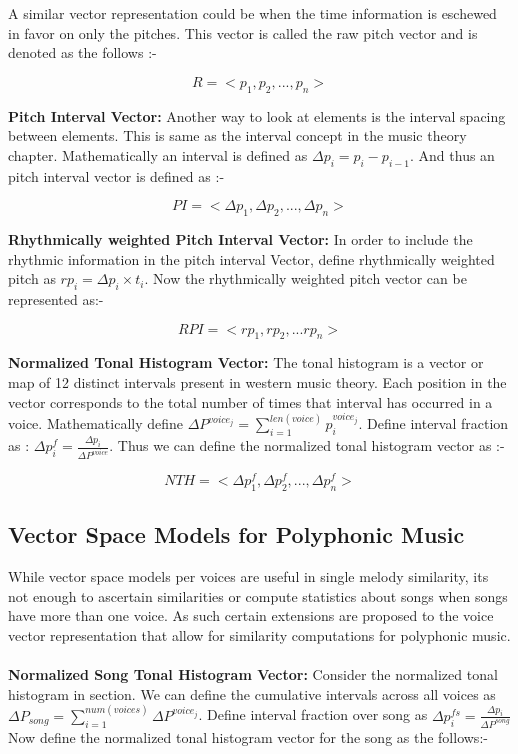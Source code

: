 \noindent A similar vector representation could be when the time information is eschewed in favor on only the pitches. This vector is called the raw pitch vector and is denoted as the follows :-

\begin{equation}
R = <p_1, p_2, ..., p_n>
\end{equation}

\noindent \textbf{Pitch Interval Vector:} Another way to look at elements is the interval spacing between elements. This is same as the interval concept in the music theory chapter. Mathematically an interval is defined as $\Delta p_i = p_i - p_{i-1}$. And thus an pitch interval vector is defined as :-

\begin{equation}
PI = <\Delta p_1, \Delta p_2, ... , \Delta p_n>
\end{equation}

\noindent \textbf{Rhythmically weighted Pitch Interval Vector:} In order to include the rhythmic information in the pitch interval Vector, define rhythmically weighted pitch as $rp_i = \Delta p_i \times t_i$. Now the rhythmically weighted pitch vector can be represented as:-

\begin{equation}
RPI = <rp_1, rp_2, ... rp_n>
\end{equation}

\noindent \textbf{Normalized Tonal Histogram Vector:} The tonal histogram is a vector or map of 12 distinct intervals present in western music theory. Each position in the vector corresponds to the total number of times that interval has occurred in a voice. Mathematically define $\Delta P^{voice_j} = \sum_{i=1}^{len(voice)} p_i^{voice_j}$. Define interval fraction as : $\Delta p^f_i = \frac{\Delta p_i}{\Delta P^{voice}}$. Thus we can define the normalized tonal histogram vector as :-

\begin{equation}
NTH = <\Delta p^f_1, \Delta p^f_2, ... , \Delta p^f_n>
\end{equation}

\subsection{Vector Space Models for Polyphonic Music} 

\noindent While vector space models per voices are useful in single melody similarity, its not enough to ascertain similarities or compute statistics about songs when songs have more than one voice. As such certain extensions are proposed to the voice vector representation that allow for similarity computations for polyphonic music.\\\\
\noindent \textbf{Normalized Song Tonal Histogram Vector:}  \noindent Consider the normalized tonal histogram in section. We can define the cumulative intervals across all voices as \\ $\Delta P_{song} = \sum_{i = 1}^{num(voices)} \Delta P^{voice_j}$. Define interval fraction over song as $\Delta p^{fs}_i = \frac{\Delta p_i}{\Delta P^{song}}$   Now define the normalized tonal histogram vector for the song as the follows:-


